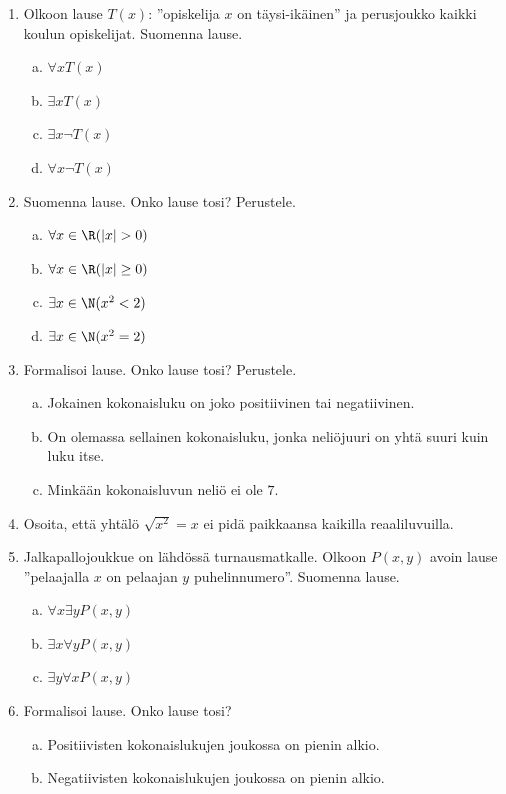 \begin{enumerate}

\item Olkoon lause
$T(x)$: ''opiskelija $x$ on täysi-ikäinen'' ja
perusjoukko kaikki koulun opiskelijat. Suomenna lause.
\begin{enumerate}[a)]
\item $\forall x T(x)$
\item $\exists x T(x)$
\item $\exists x \lnot T(x)$
\item $\forall x \lnot T(x)$
\end{enumerate}

\item Suomenna lause. Onko lause tosi? Perustele.
\begin{enumerate}[a)]
\item $\forall x\in\R (|x| > 0)$
\item $\forall x\in\R (|x| \ge 0)$
\item $\exists x\in\N (x^2 < 2)$
\item $\exists x\in\N (x^2 = 2)$
\end{enumerate}

\item
Formalisoi lause. Onko lause tosi? Perustele.
\begin{enumerate}[a)]
\item Jokainen kokonaisluku on joko positiivinen tai
negatiivinen.
\item On olemassa sellainen kokonaisluku, jonka neliöjuuri on
yhtä suuri kuin luku itse.
\item Minkään kokonaisluvun neliö ei ole $7$.
\end{enumerate}

\item Osoita, että yhtälö $\sqrt{x^2} = x$ ei pidä paikkaansa
kaikilla reaaliluvuilla.

\item Jalkapallojoukkue on lähdössä turnausmatkalle. Olkoon
$P(x, y)$ avoin lause ''pelaajalla $x$ on pelaajan $y$
puhelinnumero''. Suomenna lause.
\begin{enumerate}[a)]
\item $\forall x \exists y P(x, y)$
\item $\exists x \forall y P(x, y)$
\item $\exists y \forall x P(x, y)$
\end{enumerate}

\item
Formalisoi lause. Onko lause tosi?
\begin{enumerate}[a)]
\item Positiivisten kokonaislukujen joukossa on pienin alkio.
\item Negatiivisten kokonaislukujen joukossa on pienin alkio.
\end{enumerate}


\end{enumerate}
